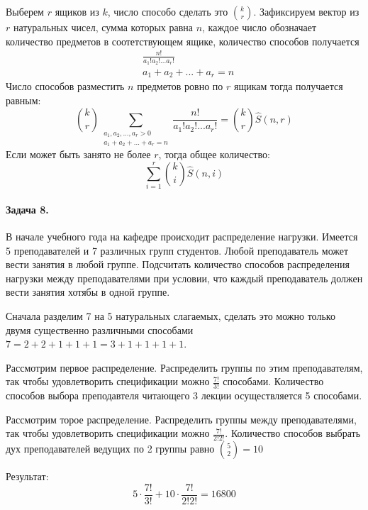 \documentclass[a4paper,12pt]{article}
\begin{document}
\begin{Solution}
Выберем $r$ ящиков из $k$, число способо сделать это $\binom{k}{r}$. Зафиксируем вектор из $r$ натуральных чисел, сумма которых равна $n$, каждое число обозначает количество предметов в соотетствующем ящике, количество способов получается
\[
	\begin{split}
		& \frac{n!}{a_1!a_2!...a_r!} \\
		& a_1+a_2+...+a_r=n
	\end{split}
\]
Число способов разместить $n$ предметов ровно по $r$ ящикам тогда получается равным:
\[
	\binom{k}{r}\sum_{\substack{a_1,a_2,...,a_r>0 \\ a_1+a_2+...+a_r=n}} \frac{n!}{a_1!a_2!...a_r!} = \binom{k}{r} \hat S \left(n,r\right)
\]
Если может быть занято не более $r$, тогда общее количество:
\[
	\sum_{i=1}^{r} \binom{k}{i} \hat S \left(n,i\right)
\]
\end{Solution}

\paragraph{Задача 8.} В начале учебного года на кафедре происходит распределение нагрузки. Имеется 5 преподавателей и 7 различных групп студентов. Любой преподаватель может вести занятия в любой группе. Подсчитать количество способов распределения нагрузки между преподавателями при условии, что каждый преподаватель должен вести занятия хотябы в одной группе.

\begin{Solution}
Сначала разделим 7 на 5 натуральных слагаемых, сделать это можно только двумя существенно различными способами $7=2+2+1+1+1=3+1+1+1+1$.

Рассмотрим первое распределение. Распределить группы по этим преподавателям, так чтобы удовлетворить спецификации можно $\frac{7!}{3!}$ способами. Количество способов выбора преподавтеля читающего 3 лекции осуществляется 5 способами.

Рассмотрим торое распределение. Распределить группы между преподавателями, так чтобы удовлетворить спецификации можно $\frac{7!}{2!2!}$. Количество способов выбрать дух преподавателей ведущих по 2 группы равно $\binom{5}{2} = 10$

Результат:
\[
	5 \cdot \frac{7!}{3!} + 10 \cdot \frac{7!}{2!2!} = 16800
\] 
\end{Solution}
\end{document}
